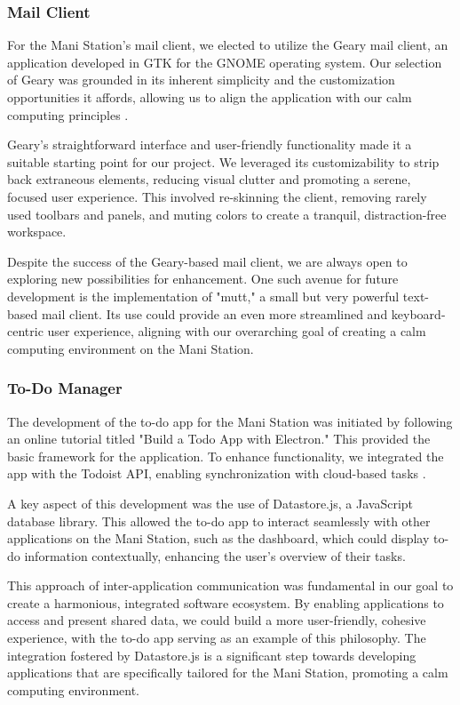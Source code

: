 \documentclass[letterpaper,twocolumn,10pt]{article}
\begin{document}
\subsubsection{Mail Client}
For the Mani Station's mail client, we elected to utilize the Geary mail client, an application developed in GTK for the GNOME operating system. Our selection of Geary was grounded in its inherent simplicity and the customization opportunities it affords, allowing us to align the application with our calm computing principles \cite{geary}.

Geary's straightforward interface and user-friendly functionality made it a suitable starting point for our project. We leveraged its customizability to strip back extraneous elements, reducing visual clutter and promoting a serene, focused user experience. This involved re-skinning the client, removing rarely used toolbars and panels, and muting colors to create a tranquil, distraction-free workspace.

Despite the success of the Geary-based mail client, we are always open to exploring new possibilities for enhancement. One such avenue for future development is the implementation of "mutt," a small but very powerful text-based mail client. Its use could provide an even more streamlined and keyboard-centric user experience, aligning with our overarching goal of creating a calm computing environment on the Mani Station.
\subsubsection{To-Do Manager}
The development of the to-do app for the Mani Station was initiated by following an online tutorial titled "Build a Todo App with Electron." This provided the basic framework for the application. To enhance functionality, we integrated the app with the Todoist API, enabling synchronization with cloud-based tasks \cite{todo-electron}\cite{todoist}.

A key aspect of this development was the use of Datastore.js, a JavaScript database library. This allowed the to-do app to interact seamlessly with other applications on the Mani Station, such as the dashboard, which could display to-do information contextually, enhancing the user's overview of their tasks.

This approach of inter-application communication was fundamental in our goal to create a harmonious, integrated software ecosystem. By enabling applications to access and present shared data, we could build a more user-friendly, cohesive experience, with the to-do app serving as an example of this philosophy. The integration fostered by Datastore.js is a significant step towards developing applications that are specifically tailored for the Mani Station, promoting a calm computing environment.
\end{document}
